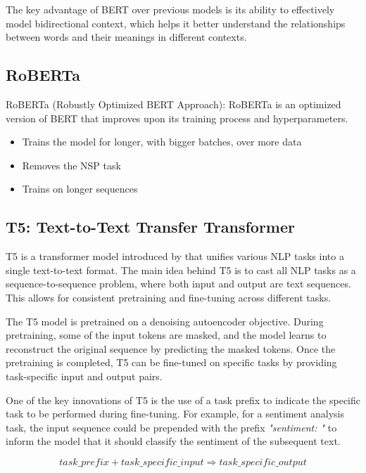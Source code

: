 \documentclass[12pt]{article}
\begin{document}
The key advantage of BERT over previous models is its ability to effectively model bidirectional context, which helps it better understand the relationships between words and their meanings in different contexts.

\subsection{RoBERTa}
RoBERTa (Robustly Optimized BERT Approach): RoBERTa is an optimized version of BERT that improves upon its training process and hyperparameters. 

\begin{itemize}
	\item Trains the model for longer, with bigger batches, over more data
	\item Removes the NSP task
	\item Trains on longer sequences
\end{itemize}

\subsection{T5: Text-to-Text Transfer Transformer}
T5 is a transformer model introduced by that unifies various NLP tasks into a single text-to-text format. The main idea behind T5 is to cast all NLP tasks as a sequence-to-sequence problem, where both input and output are text sequences. This allows for consistent pretraining and fine-tuning across different tasks.

The T5 model is pretrained on a denoising autoencoder objective. During pretraining, some of the input tokens are masked, and the model learns to reconstruct the original sequence by predicting the masked tokens. Once the pretraining is completed, T5 can be fine-tuned on specific tasks by providing task-specific input and output pairs.

One of the key innovations of T5 is the use of a task prefix to indicate the specific task to be performed during fine-tuning. For example, for a sentiment analysis task, the input sequence could be prepended with the prefix \textit{"sentiment: "} to inform the model that it should classify the sentiment of the subsequent text.

\begin{equation}
\textit{task\_prefix} + \textit{task\_specific\_input} \Rightarrow \textit{task\_specific\_output}
\end{equation}
\end{document}
